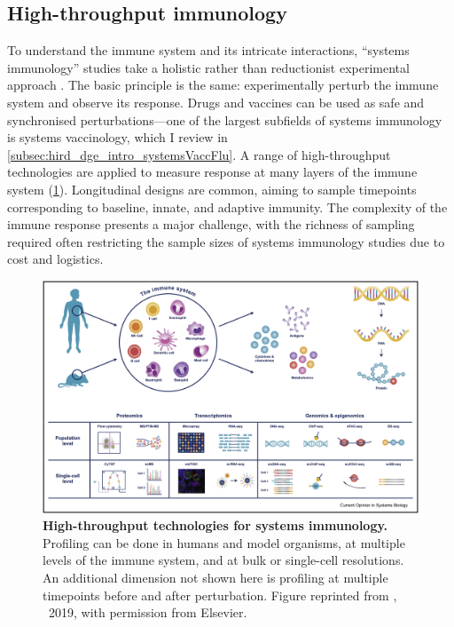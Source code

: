 \subsection{High-throughput immunology}

To understand the immune system and its intricate interactions,
\enquote{systems immunology} studies take a holistic rather than reductionist experimental approach \autocite{davis2017SystemsImmunologyJust,villani2018SystemsImmunologyLearning,pulendran2020ScienceMedicineHuman}.
The basic principle is the same: experimentally perturb the immune system and observe its response.
Drugs and vaccines can be used as safe and synchronised perturbations---one of the largest subfields of systems immunology is systems vaccinology, which I review in \cref{subsec:hird_dge_intro_systemsVaccFlu}.
A range of high-throughput technologies are applied to measure response at many layers of the immune system (\cref{fig:intro_sysImmunology}).
Longitudinal designs are common, aiming to sample timepoints corresponding to baseline, innate, and adaptive immunity.
The complexity of the immune response presents a major challenge,
with the richness of sampling required often restricting the sample sizes of systems immunology studies due to cost and logistics.

\begin{figure}
    \centering
    \includegraphics[width=1.0\textwidth,page=1]{mainmatter/figures/chapter_01/yu2019SystemsImmunologyIntegrating/1-s2.0-S2452310018301197-gr1_lrg.jpg}
    \caption[
    ]{
        \textbf{High-throughput technologies for systems immunology.}
        Profiling can be done in humans and model organisms, at multiple levels of the immune system, and at bulk or single-cell resolutions.
        An additional dimension not shown here is profiling at multiple timepoints before and after perturbation.
        Figure reprinted from \textcite{yu2019SystemsImmunologyIntegrating}, \textcopyright~2019, with permission from Elsevier.
    }
    \label{fig:intro_sysImmunology}
\end{figure}

